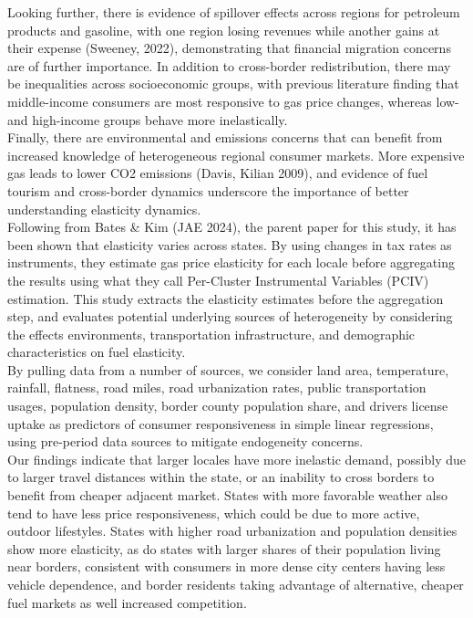 \documentclass[12pt,a4paper]{article}
\begin{document}
Looking further, there is evidence of spillover effects across regions for petroleum products and gasoline, with one region losing revenues while another gains at their expense (Sweeney, 2022), demonstrating that financial migration concerns are of further importance. In addition to cross-border redistribution, there may be inequalities across socioeconomic groups, with previous literature finding that middle-income consumers are most responsive to gas price changes, whereas low- and high-income groups behave more inelastically. \\

Finally, there are environmental and emissions concerns that can benefit from increased knowledge of heterogeneous regional consumer markets. More expensive gas leads to lower CO2 emissions (Davis, Kilian 2009), and evidence of fuel tourism and cross-border dynamics underscore the importance of better understanding elasticity dynamics. \\

Following from Bates \& Kim (JAE 2024), the parent paper for this study, it has been shown that elasticity varies across states. By using changes in tax rates as instruments, they estimate gas price elasticity for each locale before aggregating the results using what they call Per-Cluster Instrumental Variables (PCIV) estimation. This study extracts the elasticity estimates before the aggregation step, and evaluates potential underlying sources of heterogeneity by considering the effects environments, transportation infrastructure, and demographic characteristics on fuel elasticity. \\

By pulling data from a number of sources, we consider land area, temperature, rainfall, flatness, road miles, road urbanization rates, public transportation usages, population density, border county population share, and drivers license uptake as predictors of consumer responsiveness in simple linear regressions, using pre-period data sources to mitigate endogeneity concerns. \\

Our findings indicate that larger locales have more inelastic demand, possibly due to larger travel distances within the state, or an inability to cross borders to benefit from cheaper adjacent market. States with more favorable weather also tend to have less price responsiveness, which could be due to more active, outdoor lifestyles. States with higher road urbanization and population densities show more elasticity, as do states with larger shares of their population living near borders, consistent with consumers in more dense city centers having less vehicle dependence, and border residents taking advantage of alternative, cheaper fuel markets as well increased competition. \\
\end{document}
